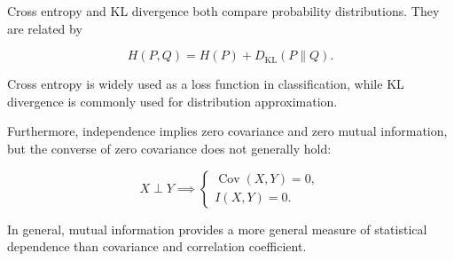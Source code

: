 \documentclass[10pt,a4paper]{article}
\begin{document}
		Cross entropy and KL divergence both compare probability
		distributions. They are related by
		
		\[
		H(P,Q)=H(P)+D_{\mathrm{KL}}(P\|Q).
		\]
		
		Cross entropy is widely used as a loss function in
		classification, while KL divergence is commonly used
		for distribution approximation.
		
		Furthermore, independence implies zero covariance and
		zero mutual information, but the converse of zero
		covariance does not generally hold:
		
		\[
		X\perp Y
		\implies
		\begin{cases}
			\operatorname{Cov}(X,Y)=0,\\
			I(X,Y)=0.
		\end{cases}
		\]
		
		In general, mutual information provides a more general
		measure of statistical dependence than covariance
		and correlation coefficient.
\end{document}
